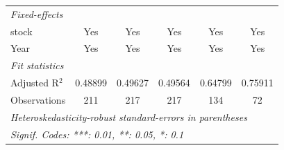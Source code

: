 \begin{tabular}{lccccc}
   \midrule
   \emph{Fixed-effects}\\
   stock                           & Yes             & Yes             & Yes             & Yes            & Yes\\  
   Year                            & Yes             & Yes             & Yes             & Yes            & Yes\\  
   \midrule
   \emph{Fit statistics}\\
   Adjusted R$^2$                  & 0.48899         & 0.49627         & 0.49564         & 0.64799        & 0.75911\\  
   Observations                    & 211             & 217             & 217             & 134            & 72\\  
   \midrule \midrule
   \multicolumn{6}{l}{\emph{Heteroskedasticity-robust standard-errors in parentheses}}\\
   \multicolumn{6}{l}{\emph{Signif. Codes: ***: 0.01, **: 0.05, *: 0.1}}\\
\end{tabular}
\par\endgroup


